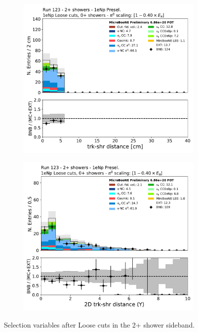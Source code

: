 \begin{figure}[H]
\begin{center}
\begin{subfigure}{0.45\textwidth}
    \end{subfigure} \\
    \begin{subfigure}{0.45\textwidth}
    \includegraphics[width=1.00\textwidth]{Sidebands/Figures/1eNp/TwoShower/TwoPShr_NP_NPLAllShr_pi0e040/tksh_distance.pdf}
    \end{subfigure}
    \begin{subfigure}{0.45\textwidth}
    \includegraphics[width=1.00\textwidth]{Sidebands/Figures/1eNp/TwoShower/TwoPShr_NP_NPLAllShr_pi0e040/trkshrhitdist2.pdf}
    \end{subfigure}
    \caption{\label{fig:sb:1eNp:twopshr:loose:vars2} Selection variables after \npsel Loose cuts in the 2+ shower sideband.}
    \end{center}
\end{figure}

